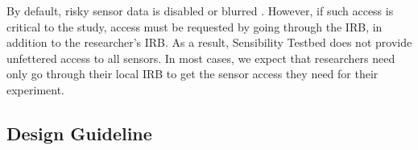 By default, risky sensor data is disabled or blurred . However, if such 
access is critical to the study, access must be requested by going through 
the \sysname IRB, in addition to the researcher's IRB. 
%
%
%
As a result, Sensibility Testbed does not
provide unfettered access to all sensors. 
In most cases, we expect
that researchers need only go through their local IRB to get
the sensor access they need for their experiment. 


\subsection{Design Guideline}\label{sec-principles}

